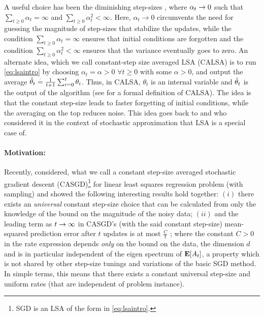 A useful choice has been the diminishing step-sizes \cite{gtd2,gtdmp,konda-tsitsiklis}, where $\alpha_t\rightarrow 0$ such that $\sum_{t\geq 0} \alpha_t=\infty$ and $\sum_{t\geq 0} \alpha^2_t<\infty$. Here, $\alpha_t\to0$ circumvents the need for guessing the magnitude of step-sizes that stabilize the updates, while the condition $\sum_{t\geq 0} \alpha_t=\infty$ ensures that initial conditions are forgotten and the condition  $\sum_{t\geq 0} \alpha^2_t<\infty$ ensures that the variance eventually goes to zero.  An alternate idea, which we call constant-step size averaged LSA (CALSA) is to run \eqref{eq:lsaintro} by choosing $\alpha_t=\alpha>0$ $\forall t\geq 0$ with some $\alpha>0$, and output the average $\hat{\theta}_t\stackrel{\cdot}{=}\frac{1}{t+1}\sum_{i=0}^t \theta_i$. Thus, in CALSA, $\theta_t$ is an internal variable and $\hat{\theta}_t$ is the output of the algorithm (see  for a formal definition of CALSA). The idea is that the constant step-size leads to faster forgetting of initial conditions, while the averaging on the top reduces noise. This idea goes back to  \citet{ruppert} and \citet{polyak-judisky} who considered it in the context of stochastic approximation that LSA is a special case of. 
\paragraph{Motivation:} Recently, \citet{bach} considered, what we call a constant step-size averaged stochastic gradient descent (CASGD)\footnote{SGD is an LSA of the form in \eqref{eq:lsaintro}.}  for linear least squares regression problem (with \iid sampling) and showed the following interesting results hold together: $(i)$ there exists an \emph{universal} constant step-size choice that can be calculated from only the knowledge of the bound on the magnitude of the noisy data; $(ii)$ and the leading term as $t\rightarrow\infty$ in CASGD's (with the said constant step-size) mean-squared prediction error after $t$ updates is at most $\frac{C}{t}$ ; where the constant $C>0$ in the rate expression depends \emph{only} on the bound on the data, the dimension $d$ and is in particular independent of the eigen spectrum of $\mathbf{E}[A_t]$, a property which is not shared by other step-size tunings and variations of the basic SGD method. In simple terms, this means that there exists a constant universal step-size  and uniform rates (that are independent of problem instance).
